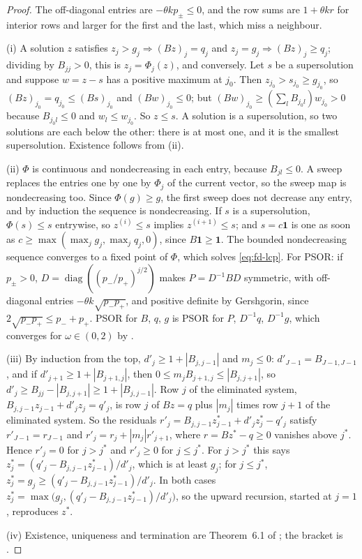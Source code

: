 \begin{proof}
The off-diagonal entries are $-\theta kp_\pm\le0$, and the row sums are $1+\theta kr$ for interior rows and
larger for the first and the last, which miss a neighbour.

(i) A solution $z$ satisfies $z_j>g_j\Rightarrow(Bz)_j=q_j$ and $z_j=g_j\Rightarrow(Bz)_j\ge q_j$; dividing by $B_{jj}>0$, this
is $z_j=\Phi_j(z)$, and conversely. Let $s$ be a supersolution and suppose $w=z-s$ has a positive
maximum at $j_0$. Then $z_{j_0}>s_{j_0}\ge g_{j_0}$, so $(Bz)_{j_0}=q_{j_0}\le(Bs)_{j_0}$ and $(Bw)_{j_0}\le0$; but
$(Bw)_{j_0}\ge(\sum_lB_{j_0l})w_{j_0}>0$ because $B_{j_0l}\le0$ and $w_l\le w_{j_0}$. So $z\le s$. A solution is a
supersolution, so two solutions are each below the other: there is at most one, and it is the
smallest supersolution. Existence follows from (ii).

(ii) $\Phi$ is continuous and nondecreasing in each entry, because $B_{jl}\le0$. A sweep replaces the
entries one by one by $\Phi_j$ of the current vector, so the sweep map is nondecreasing too. Since
$\Phi(g)\ge g$, the first sweep does not decrease any entry, and by induction the sequence is
nondecreasing. If $s$ is a supersolution, $\Phi(s)\le s$ entrywise, so $z^{(i)}\le s$ implies
$z^{(i+1)}\le s$; and $s=c\mathbf 1$ is one as soon as $c\ge\max(\max_jg_j,\max_jq_j,0)$, since $B\mathbf 1\ge\mathbf 1$. The
bounded nondecreasing sequence converges to a fixed point of $\Phi$, which solves
\eqref{eq:fd-lcp}. For PSOR: if $p_\pm>0$, $D=\operatorname{diag}((p_-/p_+)^{j/2})$ makes $P=D^{-1}BD$ symmetric, with
off-diagonal entries $-\theta k\sqrt{p_-p_+}$, and positive definite by Gershgorin, since
$2\sqrt{p_-p_+}\le p_-+p_+$. PSOR for $B$, $q$, $g$ is PSOR for $P$, $D^{-1}q$, $D^{-1}g$, which converges for
$\omega\in(0,2)$ by \textcite{cryer-1971}.

(iii) By induction from the top, $d'_j\ge1+|B_{j,j-1}|$ and $m_j\le0$: $d'_{J-1}=B_{J-1,J-1}$, and if
$d'_{j+1}\ge1+|B_{j+1,j}|$, then $0\le m_jB_{j+1,j}\le|B_{j,j+1}|$, so $d'_j\ge B_{jj}-|B_{j,j+1}|\ge1+|B_{j,j-1}|$.
Row $j$ of the eliminated system, $B_{j,j-1}z_{j-1}+d'_jz_j=q'_j$, is row $j$ of $Bz=q$ plus $|m_j|$ times
row $j+1$ of the eliminated system. So the residuals $r'_j=B_{j,j-1}z^*_{j-1}+d'_jz^*_j-q'_j$ satisfy
$r'_{J-1}=r_{J-1}$ and $r'_j=r_j+|m_j|r'_{j+1}$, where $r=Bz^*-q\ge0$ vanishes above $j^*$. Hence $r'_j=0$ for
$j>j^*$ and $r'_j\ge0$ for $j\le j^*$. For $j>j^*$ this says $z^*_j=(q'_j-B_{j,j-1}z^*_{j-1})/d'_j$, which is at least $g_j$;
for $j\le j^*$, $z^*_j=g_j\ge(q'_j-B_{j,j-1}z^*_{j-1})/d'_j$. In both cases
$z^*_j=\max\big(g_j,(q'_j-B_{j,j-1}z^*_{j-1})/d'_j\big)$, so the upward recursion, started at $j=1$, reproduces $z^*$.

(iv) Existence, uniqueness and termination are Theorem~6.1 of \textcite{forsyth-vetzal-2002}; the
bracket is .
\end{proof}

